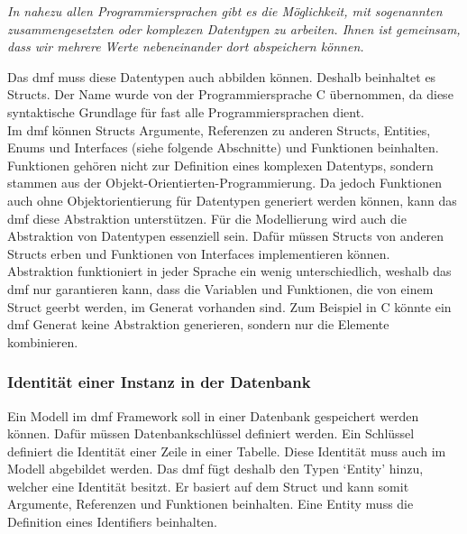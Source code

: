 \documentclass[./einleitung.tex]{subfiles}
\begin{document}
    \begin{center}
        \textit{
            In nahezu allen Programmiersprachen gibt es die Möglichkeit, mit sogenannten zusammengesetzten oder komplexen Datentypen zu arbeiten. Ihnen ist gemeinsam, dass wir mehrere Werte nebeneinander dort abspeichern können.}


    \end{center}
    Das \acrshort{dmf} muss diese Datentypen auch abbilden können.
    Deshalb beinhaltet es Structs.
    Der Name wurde von der Programmiersprache C übernommen, da diese syntaktische Grundlage für fast alle Programmiersprachen dient. \\
    Im \acrshort{dmf} können Structs Argumente, Referenzen zu anderen Structs, Entities, Enums und Interfaces (siehe folgende Abschnitte) und Funktionen beinhalten.
    Funktionen gehören nicht zur Definition eines komplexen Datentyps, sondern stammen aus der Objekt-Orientierten-Programmierung.
    Da jedoch Funktionen auch ohne Objektorientierung für Datentypen generiert werden können, kann das \acrshort{dmf} diese Abstraktion unterstützen.
    \newline
    Für die Modellierung wird auch die Abstraktion von Datentypen essenziell sein.
    Dafür müssen Structs von anderen Structs erben und Funktionen von Interfaces implementieren können. \\
    Abstraktion funktioniert in jeder Sprache ein wenig unterschiedlich, weshalb das \acrshort{dmf} nur garantieren kann, dass die Variablen und Funktionen, die von einem Struct geerbt werden, im Generat vorhanden sind.
    Zum Beispiel in C könnte ein \acrshort{dmf} Generat keine Abstraktion generieren, sondern nur die Elemente kombinieren.

    \subsubsection{Identität einer Instanz in der Datenbank}
    Ein Modell im \acrshort{dmf} Framework soll in einer Datenbank gespeichert werden können.
    Dafür müssen Datenbankschlüssel definiert werden.
    Ein Schlüssel definiert die Identität einer Zeile in einer Tabelle.
    Diese Identität muss auch im Modell abgebildet werden.
    Das \acrshort{dmf} fügt deshalb den Typen `Entity' hinzu, welcher eine Identität besitzt.
    Er basiert auf dem Struct und kann somit Argumente, Referenzen und Funktionen beinhalten.
    Eine Entity muss die Definition eines Identifiers beinhalten. \\
\end{document}
